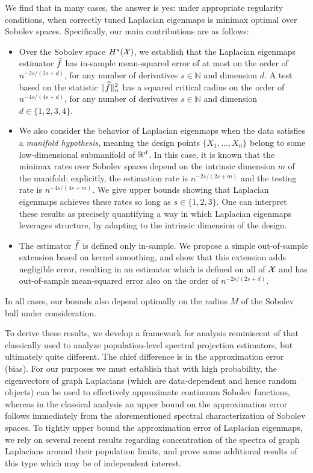 We find that in many cases, the answer is yes: under appropriate regularity conditions, when correctly tuned Laplacian eigenmaps is minimax optimal over Sobolev spaces. Specifically, our main contributions are as follows:
\begin{itemize}
	\item Over the Sobolev space $H^{s}(\mathcal{X})$, we establish that the Laplacian eigenmaps estimator $\widehat{f}$ has in-sample mean-squared error of at most on the order of $n^{-2s/(2s + d)}$, for any number of derivatives $s \in \mathbb{N}$ and dimension $d$. A test based on the statistic $\|\widehat{f}\|_n^2$ has a squared critical radius on the order of $n^{-4s/(4s + d)}$, for any number of derivatives $s \in \mathbb{N}$ and dimension $d \in \{1,2,3,4\}$. 
	\item We also consider the behavior of Laplacian eigenmaps when the data satisfies a \emph{manifold hypothesis}, meaning the design points $\{X_1,\ldots,X_n\}$ belong to some low-dimensional submanifold of $\mathbb{R}^d$. In this case, it is known that the minimax rates over Sobolev spaces depend on the intrinsic dimension $m$ of the manifold: explicitly, the estimation rate is $n^{-2s/(2s + m)}$ and the testing rate is $n^{-4s/(4s + m)}$. We give upper bounds showing that Laplacian eigenmaps achieves these rates so long as $s \in \{1,2,3\}$. One can interpret these results as precisely quantifying a way in which Laplacian eigenmaps leverages structure, by adapting to the intrinsic dimension of the design.
	\item The estimator $\widehat{f}$ is defined only in-sample. We propose a simple out-of-sample extension based on kernel smoothing, and show that this extension adds negligible error, resulting in an estimator which is defined on all of $\mathcal{X}$ and has out-of-sample mean-squared error also on the order of $n^{-2s/(2s + d)}$.
\end{itemize}
In all cases, our bounds also depend optimally on the radius $M$ of the Sobolev ball under consideration.

To derive these results, we develop a framework for analysis reminiscent of that  classically used to analyze population-level spectral projection estimators, but ultimately quite different. The chief difference is in the approximation error (bias). For our purposes we must establish that with high probability, the eigenvectors of graph Laplacians (which are data-dependent and hence random objects) can be used to effectively approximate continuum Sobolev functions, whereas in the classical analysis an upper bound on the approximation error follows immediately from the aforementioned spectral characterization of Sobolev spaces. To tightly upper bound the approximation error of Laplacian eigenmaps, we rely on several recent results regarding concentration of the spectra of graph Laplacians around their population limits, and prove some additional results of this type which may be of independent interest. 


